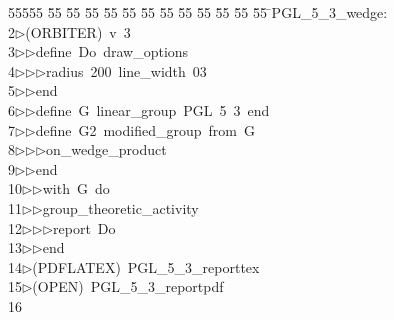 %
%
\begin{tabbing}
55555 \= 55 \= 55 \= 55 \= 55 \= 55 \= 55 \= 55 \= 55 \= 55 \= 55 \= 55 \= 55 \= \>PGL\_5\_3\_wedge:\\[0pt]
2\>$\triangleright$\>(ORBITER)\ v\ 3\ \\[0pt]
3\>$\triangleright$\>$\triangleright$\>define\ Do\ draw\_options\ \\[0pt]
4\>$\triangleright$\>$\triangleright$\>$\triangleright$\>radius\ 200\ line\_width\ 03\ \\[0pt]
5\>$\triangleright$\>$\triangleright$\>end\ \\[0pt]
6\>$\triangleright$\>$\triangleright$\>define\ G\ linear\_group\ PGL\ 5\ 3\ end\ \\[0pt]
7\>$\triangleright$\>$\triangleright$\>define\ G2\ modified\_group\ from\ G\ \\[0pt]
8\>$\triangleright$\>$\triangleright$\>$\triangleright$\>on\_wedge\_product\ \\[0pt]
9\>$\triangleright$\>$\triangleright$\>end\ \\[0pt]
10\>$\triangleright$\>$\triangleright$\>with\ G\ do\ \\[0pt]
11\>$\triangleright$\>$\triangleright$\>group\_theoretic\_activity\ \\[0pt]
12\>$\triangleright$\>$\triangleright$\>$\triangleright$\>report\ Do\ \\[0pt]
13\>$\triangleright$\>$\triangleright$\>end\\[0pt]
14\>$\triangleright$\>(PDFLATEX)\ PGL\_5\_3\_reporttex\\[0pt]
15\>$\triangleright$\>(OPEN)\ PGL\_5\_3\_reportpdf\\[0pt]
16\>\end{tabbing}
